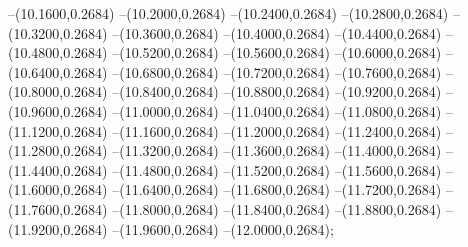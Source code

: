 {	--(10.1600,0.2684)
	--(10.2000,0.2684)
	--(10.2400,0.2684)
	--(10.2800,0.2684)
	--(10.3200,0.2684)
	--(10.3600,0.2684)
	--(10.4000,0.2684)
	--(10.4400,0.2684)
	--(10.4800,0.2684)
	--(10.5200,0.2684)
	--(10.5600,0.2684)
	--(10.6000,0.2684)
	--(10.6400,0.2684)
	--(10.6800,0.2684)
	--(10.7200,0.2684)
	--(10.7600,0.2684)
	--(10.8000,0.2684)
	--(10.8400,0.2684)
	--(10.8800,0.2684)
	--(10.9200,0.2684)
	--(10.9600,0.2684)
	--(11.0000,0.2684)
	--(11.0400,0.2684)
	--(11.0800,0.2684)
	--(11.1200,0.2684)
	--(11.1600,0.2684)
	--(11.2000,0.2684)
	--(11.2400,0.2684)
	--(11.2800,0.2684)
	--(11.3200,0.2684)
	--(11.3600,0.2684)
	--(11.4000,0.2684)
	--(11.4400,0.2684)
	--(11.4800,0.2684)
	--(11.5200,0.2684)
	--(11.5600,0.2684)
	--(11.6000,0.2684)
	--(11.6400,0.2684)
	--(11.6800,0.2684)
	--(11.7200,0.2684)
	--(11.7600,0.2684)
	--(11.8000,0.2684)
	--(11.8400,0.2684)
	--(11.8800,0.2684)
	--(11.9200,0.2684)
	--(11.9600,0.2684)
	--(12.0000,0.2684);
}
